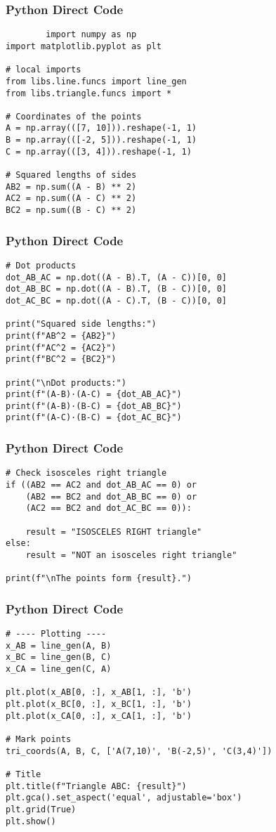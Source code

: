 \documentclass{beamer}
\begin{document}
 \begin{frame}[fragile]
		\frametitle{Python Direct Code}
		\begin{lstlisting}
        import numpy as np
import matplotlib.pyplot as plt

# local imports
from libs.line.funcs import line_gen
from libs.triangle.funcs import *

# Coordinates of the points
A = np.array(([7, 10])).reshape(-1, 1)
B = np.array(([-2, 5])).reshape(-1, 1)
C = np.array(([3, 4])).reshape(-1, 1)

# Squared lengths of sides
AB2 = np.sum((A - B) ** 2)
AC2 = np.sum((A - C) ** 2)
BC2 = np.sum((B - C) ** 2)
\end{lstlisting}
\end{frame}
 \begin{frame}[fragile]
		\frametitle{Python Direct Code}
		\begin{lstlisting}
# Dot products
dot_AB_AC = np.dot((A - B).T, (A - C))[0, 0]
dot_AB_BC = np.dot((A - B).T, (B - C))[0, 0]
dot_AC_BC = np.dot((A - C).T, (B - C))[0, 0]

print("Squared side lengths:")
print(f"AB^2 = {AB2}")
print(f"AC^2 = {AC2}")
print(f"BC^2 = {BC2}")

print("\nDot products:")
print(f"(A-B)·(A-C) = {dot_AB_AC}")
print(f"(A-B)·(B-C) = {dot_AB_BC}")
print(f"(A-C)·(B-C) = {dot_AC_BC}")
\end{lstlisting}
\end{frame}
 \begin{frame}[fragile]
		\frametitle{Python Direct Code}
		\begin{lstlisting}
# Check isosceles right triangle
if ((AB2 == AC2 and dot_AB_AC == 0) or
    (AB2 == BC2 and dot_AB_BC == 0) or
    (AC2 == BC2 and dot_AC_BC == 0)):
  
    result = "ISOSCELES RIGHT triangle"
else:
    result = "NOT an isosceles right triangle"

print(f"\nThe points form {result}.")
\end{lstlisting}
\end{frame}
 \begin{frame}[fragile]
		\frametitle{Python Direct Code}
		\begin{lstlisting}
# ---- Plotting ----
x_AB = line_gen(A, B)
x_BC = line_gen(B, C)
x_CA = line_gen(C, A)

plt.plot(x_AB[0, :], x_AB[1, :], 'b')
plt.plot(x_BC[0, :], x_BC[1, :], 'b')
plt.plot(x_CA[0, :], x_CA[1, :], 'b')

# Mark points
tri_coords(A, B, C, ['A(7,10)', 'B(-2,5)', 'C(3,4)'])

# Title
plt.title(f"Triangle ABC: {result}")
plt.gca().set_aspect('equal', adjustable='box')
plt.grid(True)
plt.show()
        \end{lstlisting}
\end{frame}
\end{document}
